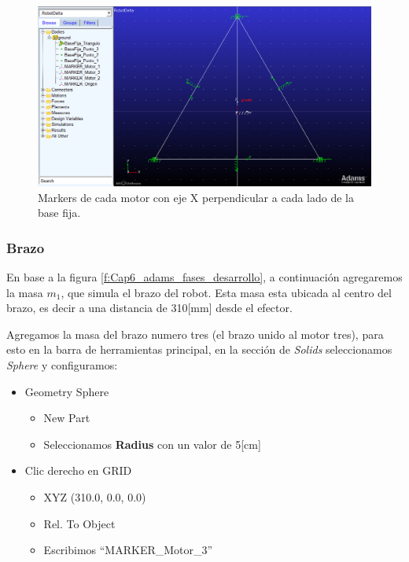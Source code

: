         \begin{figure}[h]
            \centering
            \includegraphics[width=1\linewidth]{Main/Chapter6/Images6/adams/base-fija/posicion_motores_marker_giradoss.png}
            \caption{Markers de cada motor con eje X perpendicular a cada lado de la base fija.}
            \label{f:Cap6_adams_basefija_posicion_motores_girados}
        \end{figure}
        

        \subsubsection{Brazo}
        
        En base a la figura \eqref{f:Cap6_adams_fases_desarrollo}, a continuación agregaremos la masa $m_{1}$, que simula el brazo del robot. Esta masa esta ubicada al centro del brazo, es decir a una distancia de 310[mm] desde el efector.
        
        Agregamos la masa del brazo numero tres (el brazo unido al motor tres), para esto en la barra de herramientas principal, en la sección de \textit{Solids} seleccionamos \textit{Sphere} y configuramos:
        
        \begin{scope}
            \renewcommand{\labelitemi}{\blacklozenge}
            \renewcommand{\labelitemii}{\checkmark}
            \begin{itemize}
                \item Geometry Sphere
                \begin{itemize}
                    \item New Part
                    \item Seleccionamos \textbf{Radius} con un valor de 5[cm]
                \end{itemize}
                \item Clic derecho en GRID
                \begin{itemize}
                    \item XYZ (310.0, 0.0, 0.0)
                    \item Rel. To Object
                    \item Escribimos ``MARKER\_Motor\_3''
                \end{itemize}
            \end{itemize}
        \end{scope}
        

